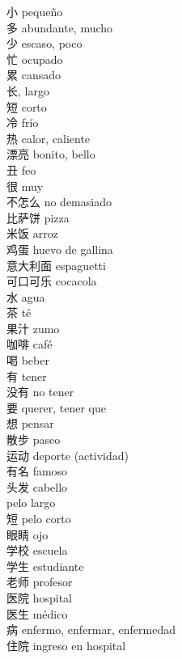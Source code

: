 \documentclass[13pt]{article}
\begin{document}
\begin{CJK*}{UTF8}{gkai}
\begin{multicols}{2}
\begin{pinyinscope}
小 \quad pequeño\\
多 \quad abundante, mucho\\
少 \quad escaso, poco\\
忙 \quad ocupado\\
累 \quad cansado\\
长, \quad largo\\
短 \quad corto\\
冷 \quad frío\\
热 \quad calor, caliente\\
漂亮 \quad bonito, bello\\
丑 \quad feo\\
很 \quad muy\\
不怎么 \quad no demasiado\\
比萨饼 \quad pizza\\
米饭 \quad arroz\\
鸡蛋 \quad huevo de gallina\\
意大利面 \quad espaguetti\\
可口可乐 \quad cocacola\\
水 \quad agua\\
茶 \quad té\\
果汁 \quad zumo\\
咖啡 \quad café\\
喝 \quad beber\\
有 \quad tener\\
没有 \quad no tener\\
要 \quad querer, tener que\\
想 \quad pensar\\
散步 \quad paseo\\
运动 \quad deporte (actividad)\\
有名 \quad famoso\\
头发 \quad cabello\\
 \quad pelo largo\\
短 \quad pelo corto\\
眼睛 \quad ojo\\
学校 \quad escuela\\
学生 \quad estudiante\\
老师 \quad profesor\\
医院 \quad hospital\\
医生 \quad médico\\
病 \quad enfermo, enfermar, enfermedad\\
住院 \quad ingreso en hospital\\

\end{pinyinscope}
\end{multicols}
\end{CJK*}
\end{document}
